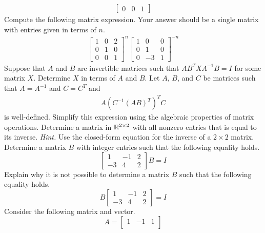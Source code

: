 \begin{tasks}[resume, style=enumerate]
\begin{align*}
\begin{bmatrix}
      0 & 0 & 1
    \end{bmatrix}
  \end{align*}
\task
  Compute the following matrix expression.  Your answer should be a
  single matrix with entries given in terms of $n$.
  \begin{align*}
    \begin{bmatrix}
      1 & 0 & 2 \\
      0 & 1 & 0 \\
      0 & 0 & 1
    \end{bmatrix}^{n}
    \begin{bmatrix}
      1 & 0 & 0 \\
      0 & 1 & 0 \\
      0 & -3 & 1
    \end{bmatrix}^{-n}
  \end{align*}
\task
  Suppose that $A$ and $B$ are invertible matrices such that
  $AB^TXA^{-1}B = I$ for some matrix $X$.  Determine $X$ in terms of
  $A$ and $B$.
\task
  Let $A$, $B$, and $C$ be matrices such that $A = A^{-1}$ and $C = C^T$ and
  \begin{align*}
    A(C^{-1}(AB)^T)^TC
  \end{align*}
  is well-defined.  Simplify this expression using the algebraic
  properties of matrix operations.
\task
  Determine a matrix in $\mathbb R^{2 \times 2}$ with all nonzero entries
  that is equal to its inverse.  \textit{Hint.} Use the closed-form
  equation for the inverse of a $2 \times 2$ matrix.
\task
  Determine a matrix $B$ with integer entries such that the following
  equality holds.
  \begin{displaymath}
    \begin{bmatrix}
      1 & -1 & 2 \\
      -3 & 4 & 2
    \end{bmatrix}
    B = I
  \end{displaymath}
\task
  Explain why it is not possible to determine a matrix $B$ such that
  the following equality holds.
  \begin{displaymath}
    B
    \begin{bmatrix}
      1 & -1 & 2 \\
      -3 & 4 & 2
    \end{bmatrix}
    = I
  \end{displaymath}
\task
  Consider the following matrix and vector.\footnotemark
  \begin{displaymath}
    A =
    \begin{bmatrix}
      1 & -1 & 1 \\

\end{bmatrix}
\end{displaymath}
\end{tasks}
